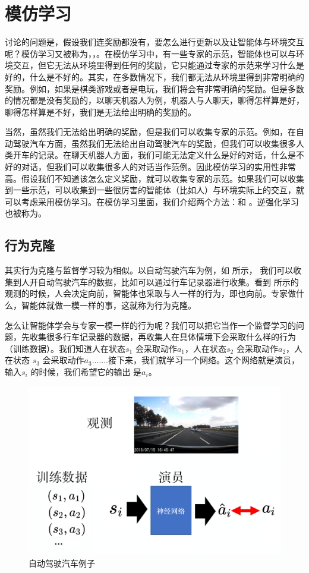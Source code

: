 \section{模仿学习} 

 讨论的问题是，假设我们连奖励都没有，要怎么进行更新以及让智能体与环境交互呢？模仿学习又被称为，，。在模仿学习中，有一些专家的示范，智能体也可以与环境交互，但它无法从环境里得到任何的奖励，它只能通过专家的示范来学习什么是好的，什么是不好的。其实，在多数情况下，我们都无法从环境里得到非常明确的奖励。例如，如果是棋类游戏或者是电玩，我们将会有非常明确的奖励。但是多数的情况都是没有奖励的，以聊天机器人为例，机器人与人聊天，聊得怎样算是好，聊得怎样算是不好，我们是无法给出明确的奖励的。

当然，虽然我们无法给出明确的奖励，但是我们可以收集专家的示范。例如，在自动驾驶汽车方面，虽然我们无法给出自动驾驶汽车的奖励，但我们可以收集很多人类开车的记录。在聊天机器人方面，我们可能无法定义什么是好的对话，什么是不好的对话，但我们可以收集很多人的对话当作范例。因此模仿学习的实用性非常高。假设我们不知道该怎么定义奖励，就可以收集专家的示范。如果我们可以收集到一些示范，可以收集到一些很厉害的智能体（比如人）与环境实际上的交互，就可以考虑采用模仿学习。在模仿学习里面，我们介绍两个方法：和 。逆强化学习也被称为。

\subsection{行为克隆}  

其实行为克隆与监督学习较为相似。以自动驾驶汽车为例，如 所示，
我们可以收集到人开自动驾驶汽车的数据，比如可以通过行车记录器进行收集。看到 所示的观测的时候，人会决定向前，智能体也采取与人一样的行为，即也向前。专家做什么，智能体就做一模一样的事，这就称为行为克隆。

怎么让智能体学会与专家一模一样的行为呢？我们可以把它当作一个监督学习的问题，先收集很多行车记录器的数据，再收集人在具体情境下会采取什么样的行为（训练数据）。我们知道人在状态$s_1$ 会采取动作$a_1$，人在状态$s_2$ 会采取动作$a_2$，人在状态 $s_3$ 会采取动作$a_3$.......接下来，我们就学习一个网络。这个网络就是演员，输入$s_i$ 的时候，我们希望它的输出 是$a_i$。

\begin{figure}[htb]
   \centering
   \includegraphics[width=0.5\linewidth]{res/ch11/11.2}
   \caption{自动驾驶汽车例子}
   \label{fig:BC_1}
\end{figure}

